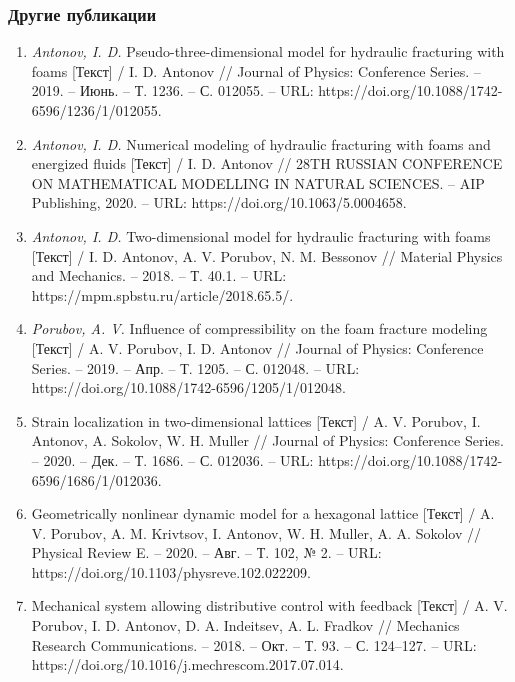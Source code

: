 \begin{frame}
	\frametitle{Другие публикации}
	\begin{tiny}
		\begin{enumerate}
			\item \textit{Antonov, I. D.} Pseudo-three-dimensional model for hydraulic fracturing with foams [Текст] / I. D. Antonov // Journal of Physics: Conference Series. -- 2019. -- Июнь. -- Т. 1236. -- С. 012055. -- URL: https://doi.org/10.1088/1742-6596/1236/1/012055.
			
			\item \textit{Antonov, I. D.} Numerical modeling of hydraulic fracturing with foams and energized fluids [Текст] / I. D. Antonov // 28TH RUSSIAN CONFERENCE ON MATHEMATICAL MODELLING IN NATURAL SCIENCES. -- AIP Publishing, 2020. -- URL: https://doi.org/10.1063/5.0004658.
			
			\item \textit{Antonov, I. D.} Two-dimensional model for hydraulic fracturing with foams [Текст] / I. D. Antonov, A. V. Porubov, N. M. Bessonov // Material Physics and Mechanics. -- 2018. -- Т. 40.1. -- URL: https://mpm.spbstu.ru/article/2018.65.5/.
			
			\item \textit{Porubov, A. V.} Influence of compressibility on the foam fracture modeling [Текст] / A. V. Porubov, I. D. Antonov // Journal of Physics: Conference Series. -- 2019. -- Апр. -- Т. 1205. -- С. 012048. -- URL: https://doi.org/10.1088/1742-6596/1205/1/012048.
			
			\item Strain localization in two-dimensional lattices [Текст] / A. V. Porubov, I. Antonov, A. Sokolov, W. H. Muller // Journal of Physics: Conference Series. -- 2020. -- Дек. -- Т. 1686. -- С. 012036. -- URL: https://doi.org/10.1088/1742-6596/1686/1/012036.
			
			\item Geometrically nonlinear dynamic model for a hexagonal lattice [Текст] / A. V. Porubov, A. M. Krivtsov, I. Antonov, W. H. Muller, A. A. Sokolov // Physical Review E. -- 2020. -- Авг. -- Т. 102, № 2. -- URL: https://doi.org/10.1103/physreve.102.022209.
			
			\item Mechanical system allowing distributive control with feedback [Текст] / A. V. Porubov, I. D. Antonov, D. A. Indeitsev, A. L. Fradkov // Mechanics Research Communications. -- 2018. -- Окт. -- Т. 93. -- С. 124--127. -- URL: https://doi.org/10.1016/j.mechrescom.2017.07.014.
			

\end{enumerate}
\end{tiny}
\end{frame}
